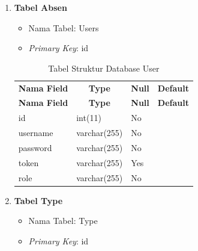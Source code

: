 \begin{enumerate}
    \item \textbf{Tabel Absen}
    
    \begin{itemize}
        \item Nama Tabel: Users
        \item \textit{Primary Key}: id
    \end{itemize}

   \begin{longtable}{|p{5cm}|p{3cm}|p{2cm}|p{3cm}|}
	    \captionsetup{position=above} %
	    \caption{Tabel Struktur Database User}
	    \label{tab:struktur-database} \\ \hline
	    \multicolumn{1}{|c|}{\textbf{Nama Field}} & \multicolumn{1}{c|}{\textbf{Type}} & \multicolumn{1}{c|}{\textbf{Null}} & \multicolumn{1}{c|}{\textbf{Default}} \\ \hline
	    \endfirsthead
	    \hline
	    \multicolumn{1}{|c|}{\textbf{Nama Field}} & \multicolumn{1}{c|}{\textbf{Type}} & \multicolumn{1}{c|}{\textbf{Null}} & \multicolumn{1}{c|}{\textbf{Default}} \\ \hline
	    \endhead
	    id & int(11) & No & \\ \hline
	    username & varchar(255) & No & \\ \hline
	    password & varchar(255) & No & \\ \hline
	    token & varchar(255) & Yes & \\ \hline
	    role & varchar(255) & No & \\ \hline
	\end{longtable}


    \item \textbf{Tabel Type}

    \begin{itemize}
        \item Nama Tabel: Type
        \item \textit{Primary Key}: id
    \end{itemize}


\end{enumerate}
